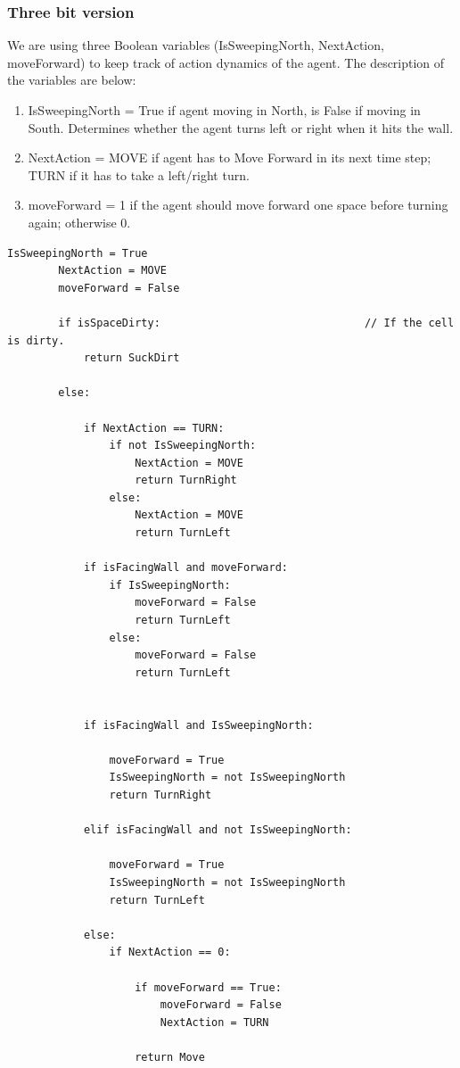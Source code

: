 \documentclass{article}
\begin{document}
\subsubsection{Three bit version}

We are using  three Boolean variables (IsSweepingNorth, NextAction, moveForward) to keep track of action dynamics of the agent. The description of the variables are below: 
\begin{enumerate}
\item IsSweepingNorth = True if agent moving in North, is False if moving in South. Determines whether the agent turns left or right when it hits the wall.
\item NextAction = MOVE if agent has to Move Forward in its next time step; TURN if it has to take a left/right turn.
\item moveForward = 1 if the agent should move forward one space before turning again; otherwise 0. 
\end{enumerate}








\begin{lstlisting}[frame=single]
		IsSweepingNorth = True
        NextAction = MOVE
        moveForward = False			

		if isSpaceDirty:								// If the cell is dirty. 
			return SuckDirt

		else:	

			if NextAction == TURN:
				if not IsSweepingNorth:
					NextAction = MOVE
					return TurnRight
				else:
					NextAction = MOVE
					return TurnLeft

			if isFacingWall and moveForward:
				if IsSweepingNorth:
					moveForward = False
					return TurnLeft
				else:
					moveForward = False
					return TurnLeft


			if isFacingWall and IsSweepingNorth:
				
				moveForward = True
				IsSweepingNorth = not IsSweepingNorth
				return TurnRight

			elif isFacingWall and not IsSweepingNorth:
				
				moveForward = True
				IsSweepingNorth = not IsSweepingNorth
				return TurnLeft

			else:
				if NextAction == 0:
					
					if moveForward == True:
						moveForward = False
						NextAction = TURN

					return Move
                    
\end{lstlisting}
\end{document}
